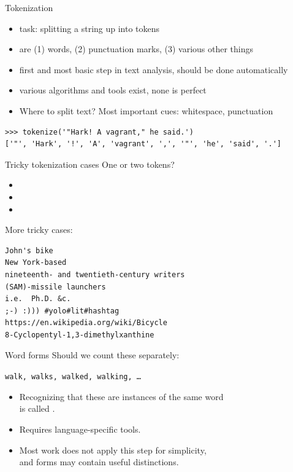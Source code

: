 \documentclass[aspectratio=169,usenames,dvipsnames]{beamer}
\begin{document}
\begin{frame}[fragile]{Tokenization}
 \begin{itemize}
  \item task: splitting a string up into tokens
  \item {} are (1) words, (2) punctuation marks, (3) various other things
  \item first and most basic step in text analysis,
        should be done automatically
  \item various algorithms and tools exist, none is perfect
  \item Where to split text? Most important cues: whitespace, punctuation
 \end{itemize}
 \begin{lstlisting}
>>> tokenize('"Hark! A vagrant," he said.')
['"', 'Hark', '!', 'A', 'vagrant', ',', '"', 'he', 'said', '.']
 \end{lstlisting}
\end{frame}

\begin{frame}[fragile]{Tricky tokenization cases}
One or two tokens?
 \begin{itemize}
  \item {}
  \item {}
  \item {}
 \end{itemize}

\pause
\vspace{1em}
More tricky cases:
\begin{verbatim}
John's bike
New York-based
nineteenth- and twentieth-century writers
(SAM)-missile launchers
i.e.  Ph.D. &c.
;-) :))) #yolo#lit#hashtag
https://en.wikipedia.org/wiki/Bicycle
8-Cyclopentyl-1,3-dimethylxanthine
\end{verbatim}
\end{frame}

\begin{frame}{Word forms}
    Should we count these separately:

    \vspace{1em}
    \texttt{walk, walks, walked, walking, \dots}

    \vspace{1em}
    \begin{itemize}
    \item Recognizing that these are instances of the same word \\
    is called .

    \item Requires language-specific tools.

    \item Most work does not apply this step for simplicity,\\
        and forms may contain useful distinctions.
    \end{itemize}
\end{frame}
\end{document}
